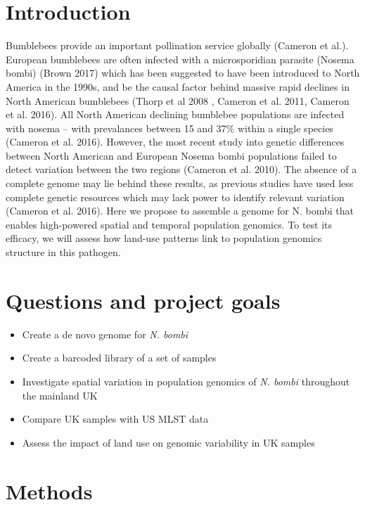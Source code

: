 \documentclass[11pt]{article}
\begin{document}
	\section{Introduction}

Bumblebees provide an important pollination service globally (Cameron et al.). European bumblebees are often infected with a microsporidian parasite (Nosema bombi) (Brown 2017) which has been suggested to have been introduced to North America in the 1990s, and be the causal factor behind massive rapid declines in North American bumblebees (Thorp et al 2008 , Cameron et al. 2011, Cameron  et al. 2016). All North American declining bumblebee populations are infected with nosema – with prevalances between 15 and 37\% within a single species (Cameron  et al. 2016). However, the most recent study into genetic differences between North American and European Nosema bombi populations failed to detect variation between the two regions (Cameron et al. 2010). The absence of a complete genome may lie behind these results, as previous studies have used less complete genetic resources which may lack power to identify relevant variation (Cameron et al. 2016). Here we propose to assemble a genome for N. bombi that enables high-powered spatial and temporal population genomics. To test its efficacy, we will assess how land-use patterns link to population genomics structure in this pathogen.	

	\section{Questions and project goals}
	
\begin{itemize}
	\item Create a de novo genome for \textit{N. bombi}
	\item Create a barcoded library of a set of samples
	\item Investigate spatial variation in population genomics of \textit{N. bombi} throughout the mainland UK
	\item Compare UK samples with US MLST data
	\item Assess the impact of land use on genomic variability in UK samples
\end{itemize}

	\section{Methods}
\end{document}
